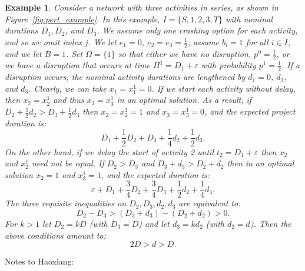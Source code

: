 \documentclass[11pt]{article}
\newtheorem{example}{Example}
\begin{document}
\begin{example}
Consider a network with three activities in series, as shown in Figure~\ref{fig:pert_example}. In this example, $I=\{S,1,2,3,T\}$ with nominal durations $D_1, D_2$, and $D_3$. We assume only one crashing option for each activity, and so we omit  index $j$. We let $e_1=0$, $e_2=e_3=\frac{1}{2}$, assume $b_i=1$ for all $i \in I$, and we let $B=1$. Set $\Omega=\{1\}$ so that either we have no disruption, $p^0=\frac{1}{2}$, or we have a disruption that occurs at time $H^1=D_1+\varepsilon$ with probability $p^1=\frac{1}{2}$. If a disruption occurs, the nominal activity durations are lengthened by $d_1=0$, $d_2$, and $d_3$. 
Clearly, we can take $x_1=x_1^1=0$. If we start each activity without delay, then $x_2=x_2^1$ and thus $x_3=x_3^1$ in an optimal solution. As a result, if $D_2 + \frac{1}{2} d_2 > D_3 + \frac{1}{2} d_3$ then $x_2=x_2^1=1$ and $x_3=x_3^1=0$, and the expected project duration is:
\begin{equation}\label{nodelay}
D_1 + \frac{1}{2} D_2 + D_3 + \frac{1}{4}d_2 + \frac{1}{2} d_3.
\end{equation} 
On the other hand, if we delay the start of activity 2 until $t_2=D_1+\varepsilon$ then $x_2$ and $x_2^1$ need not be equal. If $D_2 > D_3$ and $D_3+d_3 > D_2 + d_2$ then in an optimal solution $x_2=1$ and $x_3^1=1$, and the expected duration is:
\begin{equation}\label{delay}
\varepsilon + D_1 + \frac{3}{4} D_2 + \frac{3}{4} D_3 + \frac{1}{2} d_2 + \frac{1}{4} d_3.
\end{equation}
The three requisite inequalities on $D_2, D_3, d_2, d_3$ are equivalent to:
\[ D_2 - D_3 > (D_3+d_3) - (D_2+d_2) > 0.\]
For $k > 1$ let $D_2=k D$ (with $D_3=D$) and let $d_3=k d_2$ (with $d_2=d$). Then the above conditions amount to:
\[ 2 D > d > D . \]
\end{example}
Notes to Haoxiang:
\end{document}
